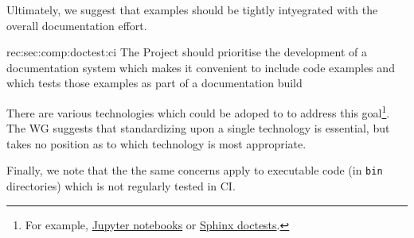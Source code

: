 Ultimately, we suggest that examples should be tightly intyegrated with the overall documentation effort.


\begin{recommendation}
    {rec:sec:comp:doctest:ci}
    {The Project should prioritise the development of a documentation system which makes it convenient to include code examples and which tests those examples as part of a documentation build}
\end{recommendation}

There are various technologies which could be adoped to to address this goal\footnote{For example, \href{https://jupyter.org/}{Jupyter notebooks} or \href{http://www.sphinx-doc.org/en/stable/ext/doctest.html}{Sphinx doctests}.}.
The WG suggests that standardizing upon a single technology is essential, but takes no position as to which technology is most appropriate.

Finally, we note that the the same concerns apply to executable code (in \texttt{bin} directories) which is not regularly tested in CI.
